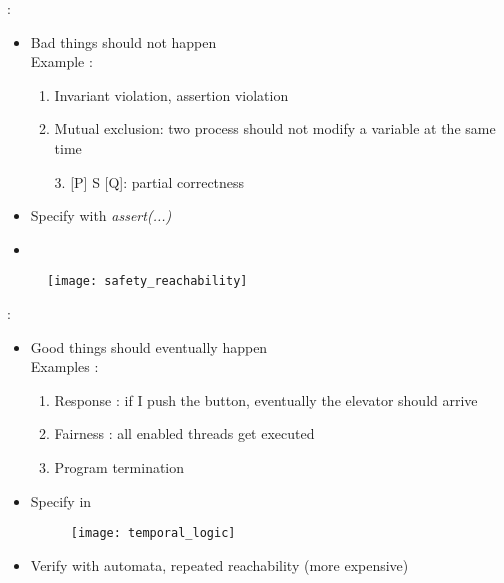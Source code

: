 \begin{minipage}[t]{0.48\textwidth}
     :
    \begin{itemize}
        \item Bad things should not happen\\
        Example :
        \begin{enumerate}
            \item Invariant violation, assertion violation
            \item Mutual exclusion: two process should not modify a variable at the same time
            \item [3.] [P] S [Q]: partial correctness
        \end{enumerate}
        \item Specify with \textit{assert(...)}
        \item {}    
    \end{itemize}
    \begin{figure}[H]
        \centering
        \texttt{[image: safety\_reachability]}
    \end{figure}
\end{minipage}
\hfill
\begin{minipage}[t]{0.48\textwidth}
     :
    \begin{itemize}
        \item Good things should eventually happen\\
        Examples : 
        \begin{enumerate}
            \item Response : if I push the button, eventually the elevator should arrive
            \item Fairness : all enabled threads get executed
            \item Program termination
        \end{enumerate}
        \item Specify in 
        \begin{figure}[H]
            \centering
            \texttt{[image: temporal\_logic]}
        \end{figure}
        \item Verify with automata, repeated reachability (more expensive)
    \end{itemize}
\end{minipage}

